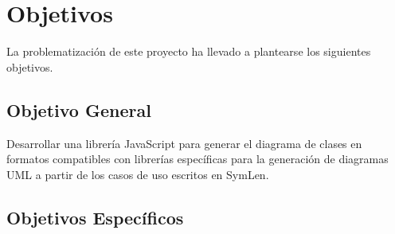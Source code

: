 \section{Objetivos}

La problematización de este proyecto ha llevado a plantearse los siguientes objetivos.

\subsection{Objetivo General}



Desarrollar una librería JavaScript para generar el diagrama de clases en formatos compatibles con librerías específicas para la generación de diagramas UML a partir de los casos de uso escritos en SymLen.

\subsection{Objetivos Específicos}

